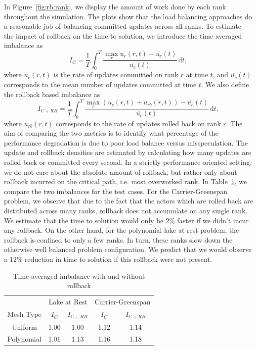 {In Figure~\ref{fig:rb:rank}, we display the amount of work done by each rank throughout the simulation. The plots show that the load balancing approaches do a reasonable job of balancing committed updates across all ranks. To estimate the impact of rollback on the time to solution, we introduce the time averaged imbalance as
\begin{equation*}
I_C = \frac{1}{T}\int_0^T \frac{ \max_r u_c(r, t) - \overline{u_c}(t)}{\overline{u_c}(t) } \,\mathrm{d} t,
\end{equation*}
where $u_c(r,t)$ is the rate of updates committed on rank $r$ at time $t$, and $\overline{u_c}(t)$ corresponds to the mean number of updates committed at time $t$. We also define the rollback based imbalance as
\begin{equation*}
I_{C+RB} = \frac{1}{T} \int_0^T \frac{ \max_r \left(u_c(r,t) + u_{rb}(r,t) \right)- \overline{u_c}(t)}{\overline{u_c}(t) } \,\mathrm{d} t,
\end{equation*}
where $u_{rb}(r,t)$ corresponds to the rate of updates rolled back on rank $r$. The aim of comparing the two metrics is to identify what percentage of the performance degradation is due to poor load balance versus misspeculation. The update and rollback densities are estimated by calculating how many updates are rolled back or committed every second.
In a strictly performance oriented setting, we do not care about the absolute amount of rollback, but rather only about rollback incurred on the critical path, i.e. most overworked rank. In Table~\ref{tab:rb:imb}, we compare the two imbalances for the test cases. For the Carrier-Greenspan problem, we observe that due to the fact that the actors which are rolled back are distributed across many ranks, rollback does not accumulate on any single rank. We estimate that the time to solution would only be $2\%$ faster if we didn't incur any rollback. On the other hand, for the polynomial lake at rest problem, the rollback is confined to only a few ranks. In turn, these ranks slow down the otherwise well balanced problem configuration. We predict that we would observe a $12\%$ reduction in time to solution if this rollback were not present.

\begin{table}
\centering
\begin{tabular}{|c | c c c c|}
\hline & \multicolumn{2}{c}{Lake at Rest} & \multicolumn{2}{c|}{Carrier-Greenspan} \\
Mesh Type& $I_C$ & $I_{C+RB}$ & $I_C$ & $I_{C+RB}$ \\ \hline
Uniform  & 1.00 & 1.00 & 1.12 & 1.14\\ \hline
Polynomial & 1.01 & 1.13 & 1.16 & 1.18\\ \hline
\end{tabular}
\caption{Time-averaged imbalance with and without rollback}
\label{tab:rb:imb}
\end{table}
}

